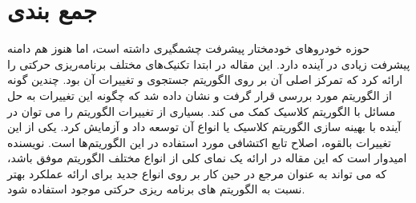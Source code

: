 

\section{جمع بندی}

حوزه خودروهای خودمختار پیشرفت چشمگیری داشته است، اما هنوز هم دامنه پیشرفت زیادی در آینده دارد. این مقاله در ابتدا تکنیک‌های مختلف برنامه‌ریزی حرکتی را ارائه کرد که تمرکز اصلی آن بر روی الگوریتم جستجوی  و تغییرات آن بود. چندین گونه از الگوریتم   مورد بررسی قرار گرفت و نشان داده شد که چگونه این تغییرات به حل مسائل با الگوریتم کلاسیک  کمک می کند. بسیاری از تغییرات الگوریتم   را می توان در آینده با بهینه سازی الگوریتم کلاسیک یا انواع آن توسعه داد و آزمایش کرد. یکی از این تغییرات بالقوه، اصلاح تابع اکتشافی مورد استفاده در این الگوریتم‌ها است. نویسنده امیدوار است که این مقاله در ارائه یک نمای کلی از انواع مختلف الگوریتم   موفق باشد، که می تواند به عنوان مرجع در حین کار بر روی انواع جدید برای ارائه عملکرد بهتر نسبت به الگوریتم های برنامه ریزی حرکتی موجود استفاده شود.
